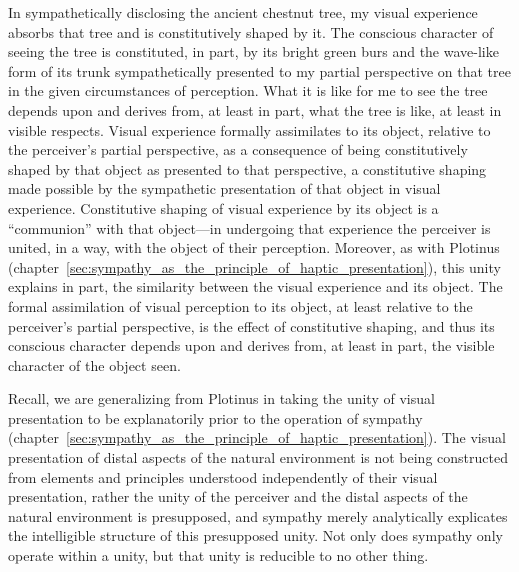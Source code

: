 In sympathetically disclosing the ancient chestnut tree, my visual experience absorbs that tree and is constitutively shaped by it. The conscious character of seeing the tree is constituted, in part, by its bright green burs and the wave-like form of its trunk sympathetically presented to my partial perspective on that tree in the given circumstances of perception. What it is like for me to see the tree depends upon and derives from, at least in part, what the tree is like, at least in visible respects. Visual experience formally assimilates to its object, relative to the perceiver's partial perspective, as a consequence of being constitutively shaped by that object as presented to that perspective, a constitutive shaping made possible by the sympathetic presentation of that object in visual experience. Constitutive shaping of visual experience by its object is a ``communion'' with that object---in undergoing that experience the perceiver is united, in a way, with the object of their perception. Moreover, as with Plotinus (chapter~\ref{sec:sympathy_as_the_principle_of_haptic_presentation}), this unity explains in part, the similarity between the visual experience and its object. The formal assimilation of visual perception to its object, at least relative to the perceiver's partial perspective, is the effect of constitutive shaping, and thus its conscious character depends upon and derives from, at least in part, the visible character of the object seen.

Recall, we are generalizing from Plotinus in taking the unity of visual presentation to be explanatorily prior to the operation of sympathy (chapter~\ref{sec:sympathy_as_the_principle_of_haptic_presentation}). The visual presentation of distal aspects of the natural environment is not being constructed from elements and principles understood independently of their visual presentation, rather the unity of the perceiver and the distal aspects of the natural environment is presupposed, and sympathy merely analytically explicates the intelligible structure of this presupposed unity. Not only does sympathy only operate within a unity, but that unity is reducible to no other thing.

